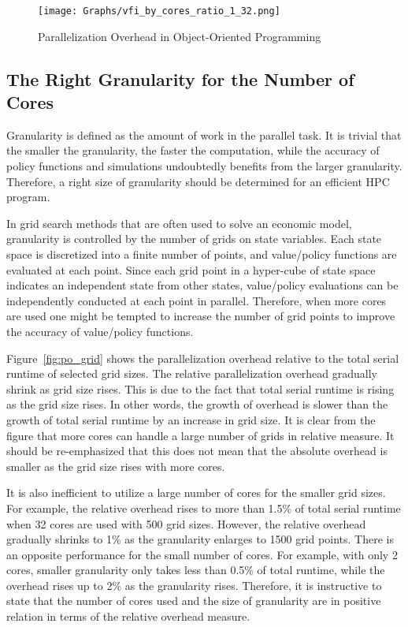 \documentclass[12pt]{article}
\begin{document}
\begin{figure}[h!]
\sf
\begin{center}
\caption{\sf Parallelization Overhead in Object-Oriented Programming}
\texttt{[image: Graphs/vfi\_by\_cores\_ratio\_1\_32.png]}\label{fig:po_oop}
\end{center}
\end{figure}


\subsection{The Right Granularity for the Number of Cores}
Granularity is defined as the amount of work in the parallel task. It is trivial that the smaller the granularity, the faster the computation, while the accuracy of policy functions and simulations undoubtedly benefits from the larger granularity. Therefore, a right size of granularity should be determined for an efficient HPC program.

In grid search methods that are often used to solve an economic model, granularity is controlled by the number of grids on state variables. Each state space is discretized into a finite number of points, and value/policy functions are evaluated at each point. Since each grid point in a hyper-cube of state space indicates an independent state from other states, value/policy evaluations can be independently conducted at each point in parallel. Therefore, when more cores are used one might be tempted to increase the number of grid points to improve the accuracy of value/policy functions.

Figure~\ref{fig:po_grid} shows the parallelization overhead relative to the total serial runtime of selected grid sizes. The relative parallelization overhead gradually shrink as grid size rises. This is due to the fact that total serial runtime is rising as the grid size rises. In other words, the growth of overhead is slower than the growth of total serial runtime by an increase in grid size. It is clear from the figure that more cores can handle a large number of grids in relative measure. It should be re-emphasized that this does not mean that the absolute overhead is smaller as the grid size rises with more cores.

It is also inefficient to utilize a large number of cores for the smaller grid sizes. For example, the relative overhead rises to more than 1.5\% of total serial runtime when 32 cores are used with 500 grid sizes. However, the relative overhead gradually shrinks to 1\% as the granularity enlarges to 1500 grid points. There is an opposite performance for the small number of cores. For example, with only 2 cores, smaller granularity only takes less than 
0.5\% of total runtime, while the overhead rises up to 2\% as the granularity rises. Therefore, it is instructive to state that the number of cores used and the size of granularity are in positive relation in terms of the relative overhead measure.
\end{document}
